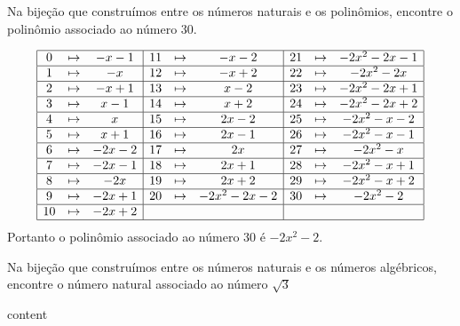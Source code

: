 \begin{exercicio}
	Na bijeção que construímos entre os números naturais e os polinômios, encontre o polinômio associado ao número 30.
\end{exercicio}
\begin{solucao}
	\begin{equation*}
		\begin{array}{|ccc|ccc|ccc|}
			\hline
			0  & \mapsto & -x-1  & 11 & \mapsto & -x-2       & 21 & \mapsto & -2x^2-2x-1 \\ \hline
			1  & \mapsto & -x    & 12 & \mapsto & -x+2       & 22 & \mapsto & -2x^2-2x   \\ \hline
			2  & \mapsto & -x+1  & 13 & \mapsto & x-2        & 23 & \mapsto & -2x^2-2x+1 \\ \hline
			3  & \mapsto & x-1   & 14 & \mapsto & x+2        & 24 & \mapsto & -2x^2-2x+2 \\ \hline
			4  & \mapsto & x     & 15 & \mapsto & 2x-2       & 25 & \mapsto & -2x^2-x-2  \\ \hline
			5  & \mapsto & x+1   & 16 & \mapsto & 2x-1       & 26 & \mapsto & -2x^2-x-1  \\ \hline
			6  & \mapsto & -2x-2 & 17 & \mapsto & 2x         & 27 & \mapsto & -2x^2-x    \\ \hline
			7  & \mapsto & -2x-1 & 18 & \mapsto & 2x+1       & 28 & \mapsto & -2x^2-x+1  \\ \hline
			8  & \mapsto & -2x   & 19 & \mapsto & 2x+2       & 29 & \mapsto & -2x^2-x+2  \\ \hline
			9  & \mapsto & -2x+1 & 20 & \mapsto & -2x^2-2x-2 & 30 & \mapsto & -2x^2-2    \\ \hline
			10 & \mapsto & -2x+2 &    &         &            &    &         &            \\ \hline
		\end{array}
	\end{equation*}
	Portanto o polinômio associado ao número 30 é $-2x^2-2$.
\end{solucao}

\begin{exercicio}
	Na bijeção que construímos entre os números naturais e os números algébricos, encontre o número natural associado ao número $\sqrt{3}$
\end{exercicio}
\begin{solucao}
	content
\end{solucao}

